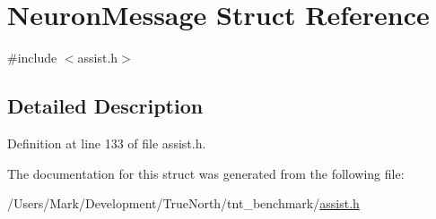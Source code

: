 \hypertarget{struct_neuron_message}{}\section{Neuron\+Message Struct Reference}
\label{struct_neuron_message}


{\ttfamily \#include $<$assist.\+h$>$}



\subsection{Detailed Description}


Definition at line 133 of file assist.\+h.



The documentation for this struct was generated from the following file\+:\begin{DoxyCompactItemize}
\item 
/\+Users/\+Mark/\+Development/\+True\+North/tnt\+\_\+benchmark/\hyperlink{assist_8h}{assist.\+h}\end{DoxyCompactItemize}
